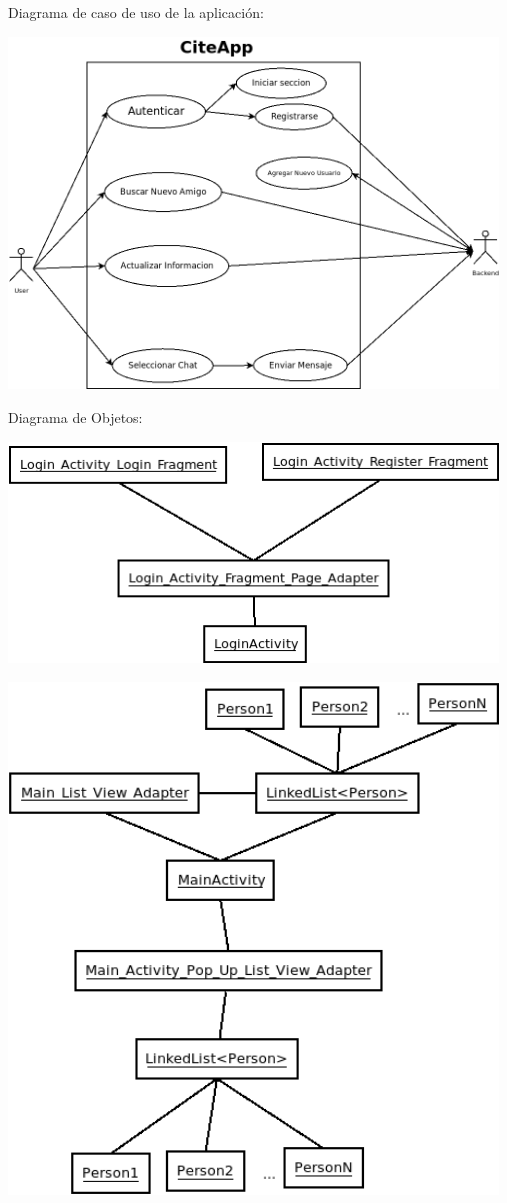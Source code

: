 Diagrama de caso de uso de la aplicación:

\includegraphics[width=13cm]{Images/UML/CasoUso.png}

Diagrama de Objetos:

\includegraphics[width=13cm]{Images/UML/LoginActivityDiagramObject.png}

\includegraphics[width=13cm]{Images/UML/MainActivityDiagramObject.png}

